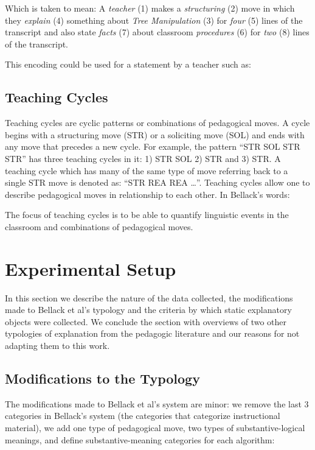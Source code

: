 \documentclass[conference]{IEEEtran}
\begin{document}
Which is taken to mean: A \emph{teacher} (1) makes a \emph{structuring} (2) move
in which they \emph{explain} (4) something about \emph{Tree Manipulation} (3) for
\emph{four} (5) lines of the transcript and also state \emph{facts} (7) about
classroom \emph{procedures} (6) for \emph{two} (8) lines of the transcript.

This encoding could be used for a statement by a teacher such as:


\subsection{Teaching Cycles}
Teaching cycles are cyclic patterns or combinations of pedagogical moves. A
cycle begins with a structuring move (STR) or a soliciting move (SOL) and ends
with any move that precedes a new cycle. For example, the pattern ``STR SOL STR
STR'' has three teaching cycles in it: 1) STR SOL 2) STR and 3) STR. A teaching
cycle which has many of the same type of move referring back to a single STR
move is denoted as: ``STR REA REA \ldots''. Teaching cycles allow one to
describe pedagogical moves in relationship to each other. In Bellack's words:


The focus of teaching cycles is to be able to quantify linguistic events in the
classroom and combinations of pedagogical moves. 

\section{Experimental Setup}
In this section we describe the nature of the data collected, the modifications
made to Bellack et al's typology and the criteria by which static explanatory
objects were collected. We conclude the section with overviews of two other
typologies of explanation from the pedagogic literature and our reasons for not
adapting them to this work.

\subsection{Modifications to the Typology}
The modifications made to Bellack et al's system are minor: we remove
the last 3 categories in Bellack's system (the categories that categorize
instructional material), we add one type of pedagogical move, two types of
substantive-logical meanings, and define substantive-meaning categories for each
algorithm:
\end{document}
